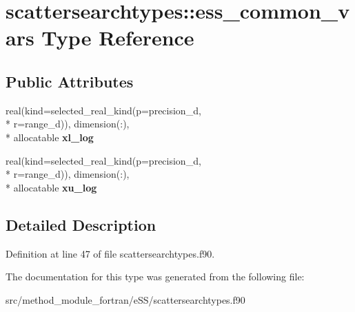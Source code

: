\hypertarget{structscattersearchtypes_1_1ess__common__vars}{\section{scattersearchtypes\-:\-:ess\-\_\-common\-\_\-vars Type Reference}
\label{structscattersearchtypes_1_1ess__common__vars}
}
\subsection*{Public Attributes}
\begin{DoxyCompactItemize}
\item 
\hypertarget{structscattersearchtypes_1_1ess__common__vars_aad44f99bd1d61ce98e74df2ba705fbe3}{real(kind=selected\-\_\-real\-\_\-kind(p=precision\-\_\-d, \\*
r=range\-\_\-d)), dimension(\-:), \\*
allocatable {\bfseries xl\-\_\-log}}\label{structscattersearchtypes_1_1ess__common__vars_aad44f99bd1d61ce98e74df2ba705fbe3}

\item 
\hypertarget{structscattersearchtypes_1_1ess__common__vars_a8b1bfca0554c386aa31b846574f6978a}{real(kind=selected\-\_\-real\-\_\-kind(p=precision\-\_\-d, \\*
r=range\-\_\-d)), dimension(\-:), \\*
allocatable {\bfseries xu\-\_\-log}}\label{structscattersearchtypes_1_1ess__common__vars_a8b1bfca0554c386aa31b846574f6978a}

\end{DoxyCompactItemize}


\subsection{Detailed Description}


Definition at line 47 of file scattersearchtypes.\-f90.



The documentation for this type was generated from the following file\-:\begin{DoxyCompactItemize}
\item 
src/method\-\_\-module\-\_\-fortran/e\-S\-S/scattersearchtypes.\-f90\end{DoxyCompactItemize}

